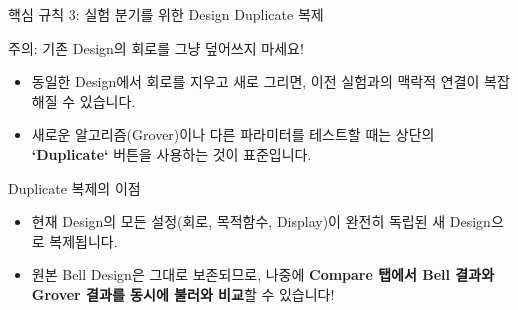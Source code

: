 \documentclass[aspectratio=169, 10pt]{beamer}
\begin{document}
\begin{frame}{핵심 규칙 3: 실험 분기를 위한 Design Duplicate 복제}
    \begin{qcalert}{{주의: 기존 Design의 회로를 그냥 덮어쓰지 마세요!}}
        \begin{itemize}
            \item 동일한 Design에서 회로를 지우고 새로 그리면, 이전 실험과의 맥락적 연결이 복잡해질 수 있습니다.
            \pause
            \item 새로운 알고리즘(Grover)이나 다른 파라미터를 테스트할 때는 상단의 \textbf{`Duplicate`} 버튼을 사용하는 것이 표준입니다.
        \end{itemize}
    \end{qcalert}
    \vspace{0.2cm}
    \begin{qcblock}{Duplicate 복제의 이점}
        \begin{itemize}
            \item 현재 Design의 모든 설정(회로, 목적함수, Display)이 완전히 독립된 새 Design으로 복제됩니다.
            \pause
            \item 원본 Bell Design은 그대로 보존되므로, 나중에 \textbf{Compare 탭에서 Bell 결과와 Grover 결과를 동시에 불러와 비교}할 수 있습니다!
        \end{itemize}
    \end{qcblock}
\end{frame}
\end{document}
